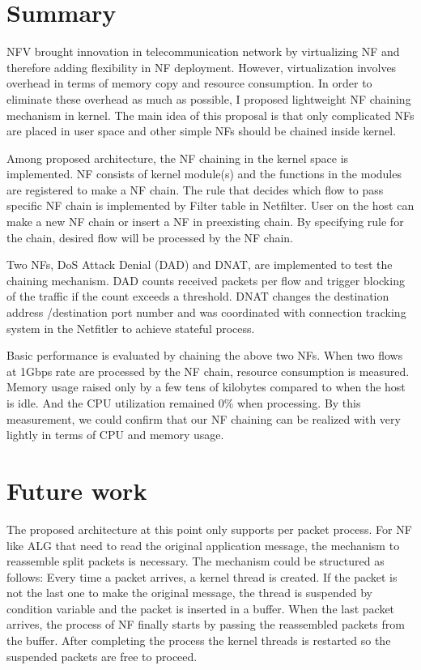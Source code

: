 \section{Summary}
NFV brought innovation in telecommunication network by virtualizing NF and therefore adding flexibility in NF deployment. However, virtualization involves overhead in terms of memory copy and resource consumption. In order to eliminate these overhead as much as possible, I proposed lightweight NF chaining mechanism in kernel. The main idea of this proposal is that only complicated NFs are placed in user space and other simple NFs should be chained inside kernel. 

Among proposed architecture, the NF chaining in the kernel space is implemented. NF consists of kernel module(s) and the functions in the modules are registered to make a NF chain. The rule that decides which flow to pass specific NF chain is implemented by Filter table in Netfilter. User on the host can make a new NF chain or insert a NF in preexisting chain. By specifying rule for the chain, desired flow will be processed by the NF chain. 

Two NFs, DoS Attack Denial (DAD) and DNAT, are implemented to test the chaining mechanism. DAD counts received packets per flow and trigger blocking of the traffic if the count exceeds a threshold. DNAT changes the destination address /destination port number and was coordinated with connection tracking system in the Netfitler to achieve stateful process. 

Basic performance is evaluated by chaining the above two NFs. When two flows at 1Gbps rate are processed by the NF chain, resource consumption is measured. Memory usage raised only by a few tens of kilobytes compared to when the host is idle. And the CPU utilization remained 0\% when processing. By this measurement, we could confirm that our NF chaining can be realized with very lightly in terms of CPU and memory usage. 

\section{Future work}
The proposed architecture at this point only supports per packet process. For NF like ALG that need to read the original application message, the mechanism to reassemble split packets is necessary. The mechanism could be structured as follows: Every time a packet arrives, a kernel thread is created. If the packet is not the last one to make the original message, the thread is suspended by condition variable and the packet is inserted in a buffer. When the last packet arrives, the process of NF finally starts by passing the reassembled packets from the buffer. After completing the process the kernel threads is restarted so the suspended packets are free to proceed. 